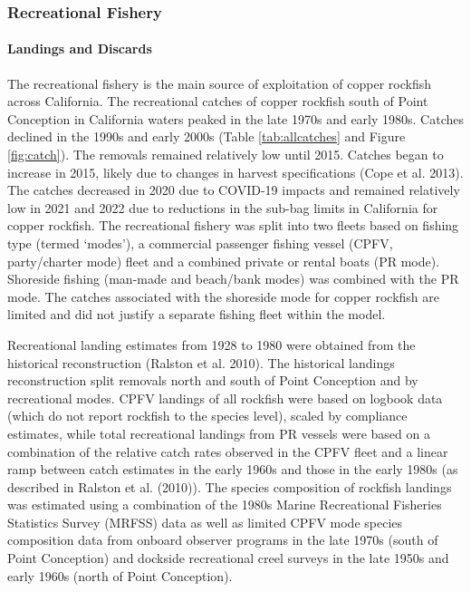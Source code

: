 \documentclass[11pt,
  english,
  letterpaper,
]{article}
\begin{document}
\hypertarget{recreational-fishery}{%
\subsubsection{Recreational Fishery}\label{recreational-fishery}}

\hypertarget{landings-and-discards-1}{%
\paragraph{Landings and Discards}\label{landings-and-discards-1}}

\hfill\break

The recreational fishery is the main source of exploitation of copper rockfish across California. The recreational catches of copper rockfish south of Point Conception in California waters peaked in the late 1970s and early 1980s. Catches declined in the 1990s and early 2000s (Table \ref{tab:allcatches} and Figure \ref{fig:catch}). The removals remained relatively low until 2015. Catches began to increase in 2015, likely due to changes in harvest specifications (Cope et al. 2013). The catches decreased in 2020 due to COVID-19 impacts and remained relatively low in 2021 and 2022 due to reductions in the sub-bag limits in California for copper rockfish. The recreational fishery was split into two fleets based on fishing type (termed `modes'), a commercial passenger fishing vessel (CPFV, party/charter mode) fleet and a combined private or rental boats (PR mode). Shoreside fishing (man-made and beach/bank modes) was combined with the PR mode. The catches associated with the shoreside mode for copper rockfish are limited and did not justify a separate fishing fleet within the model.

Recreational landing estimates from 1928 to 1980 were obtained from the historical reconstruction (Ralston et al. 2010). The historical landings reconstruction split removals north and south of Point Conception and by recreational modes. CPFV landings of all rockfish were based on logbook data (which do not report rockfish to the species level), scaled by compliance estimates, while total recreational landings from PR vessels were based on a combination of the relative catch rates observed in the CPFV fleet and a linear ramp between catch estimates in the early 1960s and those in the early 1980s (as described in Ralston et al. (2010)). The species composition of rockfish landings was estimated using a combination of the 1980s Marine Recreational Fisheries Statistics Survey (MRFSS) data as well as limited CPFV mode species composition data from onboard observer programs in the late 1970s (south of Point Conception) and dockside recreational creel surveys in the late 1950s and early 1960s (north of Point Conception).
\end{document}
